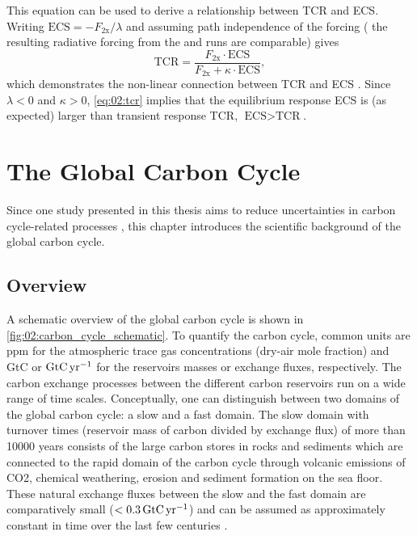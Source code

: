 This equation can be used to derive a relationship between \ac{TCR} and
\ac{ECS}. Writing $\text{ECS} = -F_\text{2x} / \lambda$ and assuming path
independence of the forcing (\ie{} the resulting radiative forcing from the
\onepctcotwo{} and  runs are comparable) gives
\begin{equation}
  \text{TCR} = \frac{F_\text{2x} \cdot \text{ECS}}{F_\text{2x} + \kappa \cdot
    \text{ECS}},
  \label{eq:02:tcr_vs_ecs}
\end{equation}
which demonstrates the non-linear connection between \ac{TCR} and \ac{ECS}
\autocite{Gregory2008, Nijsse2020}. Since $\lambda < 0$ and $\kappa > 0$,
\cref{eq:02:tcr} implies that the equilibrium response \ac{ECS} is (as
expected) larger than transient response \ac{TCR}, \ie{} $\text{ECS} >
\text{TCR}$.


\section{The Global Carbon Cycle}
\label{sec:02:carbon_cycle}

Since one study presented in this thesis aims to reduce uncertainties in carbon
cycle-related processes ,
this chapter introduces the scientific background of the global carbon cycle.


\subsection{Overview}
\label{subsec:02:carbon_cycle_overview}

A schematic overview of the global carbon cycle is shown in
\cref{fig:02:carbon_cycle_schematic}. To quantify the carbon cycle, common
units are \ac{ppm} for the atmospheric trace gas concentrations (dry-air mole
fraction) and \ac{GtC} or $\si{\GtCyr{}}$ for the reservoirs masses or exchange
fluxes, respectively. The carbon exchange processes between the different
carbon reservoirs run on a wide range of time scales. Conceptually, one can
distinguish between two domains of the global carbon cycle: a slow and a fast
domain. The slow domain with turnover times (reservoir mass of carbon divided
by exchange flux) of more than 10000 years consists of the large carbon stores
in rocks and sediments which are connected to the rapid domain of the carbon
cycle through volcanic emissions of \ac{CO2}, chemical weathering, erosion and
sediment formation on the sea floor. These natural exchange fluxes between the
slow and the fast domain are comparatively small ($< 0.3 \unit{\GtCyr{}}$) and
can be assumed as approximately constant in time over the last few centuries
\autocite{Ciais2013}.

